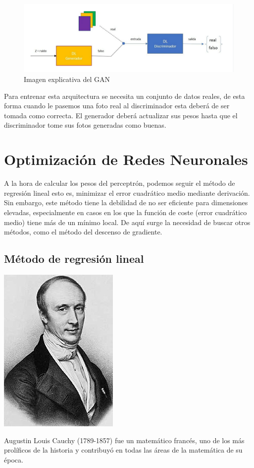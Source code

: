\documentclass[11pt,twoside,titlepage,a4paper]{article}
\newcommand{\margenimagen}{
\newgeometry{
    left=2.5cm, %
	right=5cm, %
	bottom=2.5cm %
}
}
\numberwithin{equation}{section} %
\theoremstyle{usual}
\begin{document}
\newpage\restoregeometry

\begin{figure}[!h]
\center
\includegraphics[width=\textwidth]{Source/images/GAN.png}
\caption[GAN]{Imagen explicativa del GAN}
\end{figure}

Para entrenar esta arquitectura se necesita un conjunto de datos 
reales, de esta forma cuando le pasemos una foto real al 
discriminador esta deberá de ser tomada como correcta. El generador 
deberá actualizar sus pesos hasta que el discriminador tome sus 
fotos generadas como buenas.

\newpage\margenimagen

\section{Optimización de Redes Neuronales}
    A la hora de calcular los pesos del perceptrón, podemos seguir el método de regresión lineal esto es, minimizar el error cuadrático medio mediante derivación. Sin embargo, este método tiene la debilidad de no ser eficiente para dimensiones elevadas, especialmente en casos en los que la función de coste (error cuadrático medio) tiene más de un mínimo local. De aquí surge la necesidad de buscar otros métodos, como el método del descenso de gradiente.

    \subsection{Método de regresión lineal}
    
        \begin{marginfigure}
        \includegraphics[width=0.5\marginparwidth]{Source/images/cauchy.jpg}
        \caption{\scriptsize Augustin Louis Cauchy (1789-1857) \cite{cauchy-wikipedia} fue un matemático francés, uno de los más prolíficos de la historia y contribuyó en todas las áreas de la matemática de su época.}
    \end{marginfigure}
    
\end{document}
